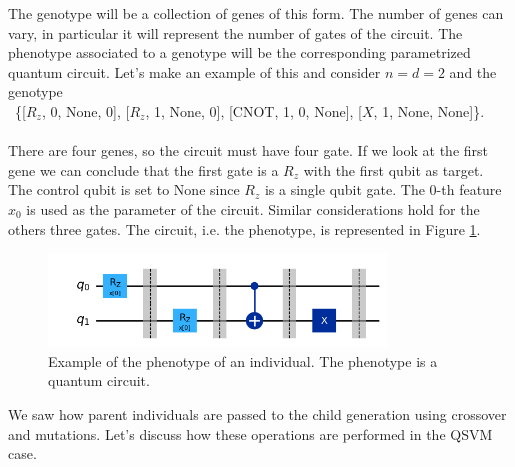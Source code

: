 \documentclass[12pt]{article}
\begin{document}
The genotype will be a collection of genes of this form. The number of genes can vary, in particular it will represent the number of gates of the circuit. The phenotype associated to a genotype will be the corresponding parametrized quantum circuit. Let's make an example of this and consider $n=d=2$ and the genotype \\\ \{[$R_z$, 0, None, 0], [$R_z$, 1, None, 0], [CNOT, 1, 0, None], [$X$, 1, None, None]\}. \\\\ There are four genes, so the circuit must have four gate. If we look at the first gene we can conclude that the first gate is a $R_z$ with the first qubit as target. The control qubit is set to None since $R_z$ is a single qubit gate. The 0-th feature $x_0$ is used as the parameter of the circuit. Similar considerations hold for the others three gates. The circuit, i.e. the phenotype, is represented in Figure \ref{fig:fenotip}.
\begin{figure}[h!]
    \centering
    \includegraphics[width=0.8\textwidth]{images/fenotip.png}
    \caption{Example of the phenotype of an individual. The phenotype is a quantum circuit.}
    \label{fig:fenotip}
\end{figure}

We saw how parent individuals are passed to the child generation using crossover and mutations. Let's discuss how these operations are performed in the QSVM case. 
\end{document}
